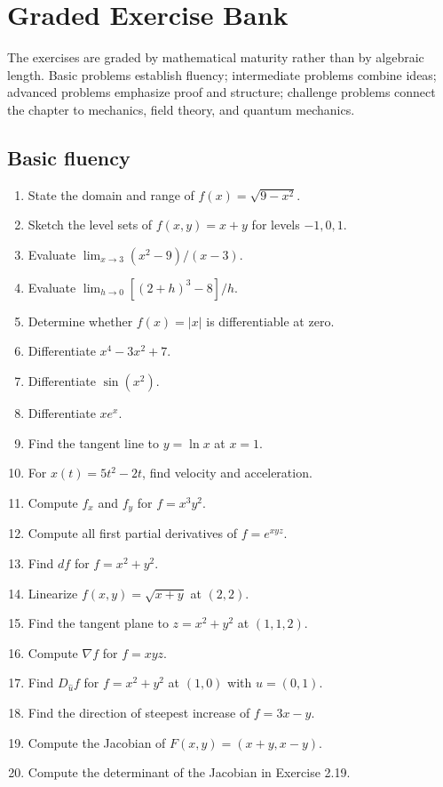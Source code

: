 \section{Graded Exercise Bank}
\label{sec:ch2-exercise-bank}

The exercises are graded by mathematical maturity rather than by algebraic
length.  Basic problems establish fluency; intermediate problems combine
ideas; advanced problems emphasize proof and structure; challenge problems
connect the chapter to mechanics, field theory, and quantum mechanics.
\subsection{Basic fluency}
\begin{enumerate}
  \item State the domain and range of $f(x)=\sqrt{9-x^2}$.
  \item Sketch the level sets of $f(x,y)=x+y$ for levels $-1,0,1$.
  \item Evaluate $\lim_{x\to3}(x^2-9)/(x-3)$.
  \item Evaluate $\lim_{h\to0}[(2+h)^3-8]/h$.
  \item Determine whether $f(x)=|x|$ is differentiable at zero.
  \item Differentiate $x^4-3x^2+7$.
  \item Differentiate $\sin(x^2)$.
  \item Differentiate $xe^x$.
  \item Find the tangent line to $y=\ln x$ at $x=1$.
  \item For $x(t)=5t^2-2t$, find velocity and acceleration.
  \item Compute $f_x$ and $f_y$ for $f=x^3y^2$.
  \item Compute all first partial derivatives of $f=e^{xyz}$.
  \item Find $df$ for $f=x^2+y^2$.
  \item Linearize $f(x,y)=\sqrt{x+y}$ at $(2,2)$.
  \item Find the tangent plane to $z=x^2+y^2$ at $(1,1,2)$.
  \item Compute $\nabla f$ for $f=xyz$.
  \item Find $D_{\hat u}f$ for $f=x^2+y^2$ at $(1,0)$ with $\hat u=(0,1)$.
  \item Find the direction of steepest increase of $f=3x-y$.
  \item Compute the Jacobian of $F(x,y)=(x+y,x-y)$.
  \item Compute the determinant of the Jacobian in Exercise 2.19.

\end{enumerate}
